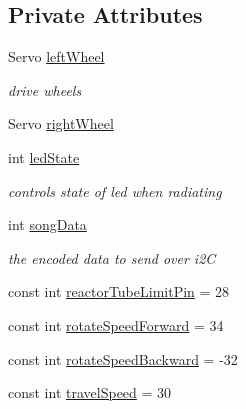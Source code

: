 \subsection*{Private Attributes}
\begin{DoxyCompactItemize}
\item 
Servo \hyperlink{classRobot_af357e059c6c07190c92c6c9a00e2b8af}{left\-Wheel}
\begin{DoxyCompactList}\small\item\em drive wheels \end{DoxyCompactList}\item 
Servo \hyperlink{classRobot_a3b2dd5b89e44fd3a7ba239554fb5b8a7}{right\-Wheel}
\item 
int \hyperlink{classRobot_a3c7308c71db125a8840f9c82b5fec9ca}{led\-State}
\begin{DoxyCompactList}\small\item\em controls state of led when radiating \end{DoxyCompactList}\item 
int \hyperlink{classRobot_a7818916adfa736ab4cb21011fe302cdb}{song\-Data}
\begin{DoxyCompactList}\small\item\em the encoded data to send over i2\-C \end{DoxyCompactList}\item 
const int \hyperlink{classRobot_a351d754436c8f569432ef7a06641f98a}{reactor\-Tube\-Limit\-Pin} = 28
\item 
const int \hyperlink{classRobot_a9cf41f47520ed8f848da5c6e2d0ff7b0}{rotate\-Speed\-Forward} = 34
\item 
const int \hyperlink{classRobot_a04bc29522467c056ae6698017f32f048}{rotate\-Speed\-Backward} = -\/32
\item 
const int \hyperlink{classRobot_a87ec942d7d53b1a4b1c46422f6a134eb}{travel\-Speed} = 30
\end{DoxyCompactItemize}
